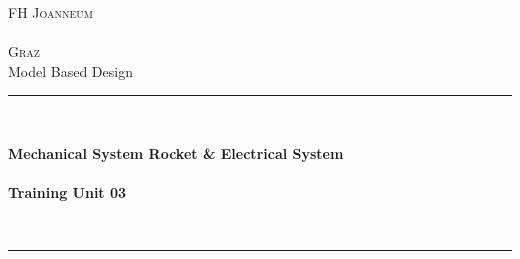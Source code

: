 \thispagestyle{empty}


\begin{titlepage}

	\begin{center}
	
	\textsc{
		\LARGE FH Joanneum\\~\\Graz}\\[1.5cm]
	\vfill{}
	\large Model Based Design
	\\[0.5cm]
	\newcommand{\HRule}{\rule{\linewidth}{0.5mm}}
	\HRule
	\\[0.4cm]
	{
	
		\Huge \bfseries Mechanical System Rocket \& Electrical System\\
						
	        ~\\
	        \large  Training Unit 03  }
	\\[0.4cm]
	\HRule
	\\[0.5cm]
	
	
	\vfill{}
	

\end{center}
\end{titlepage}
